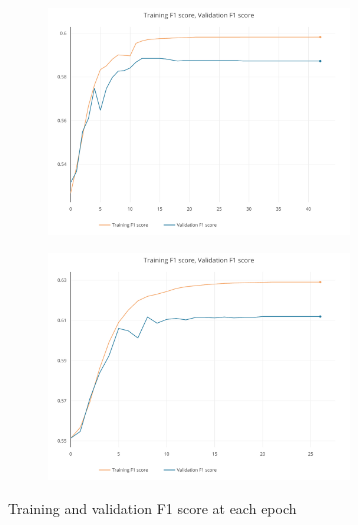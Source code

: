 \documentclass[journal]{IEEEtran}
\begin{document}
\begin{figure}[h]
	\centering

	\begin{subfigure}{0.49\textwidth}
		\centering
		\includegraphics[height = 6cm]{Images/f1score.pdf}
	\end{subfigure}
	\hspace{1mm}
	\begin{subfigure}{0.49\textwidth}
		\centering
		\includegraphics[height = 6cm]{Images/f1score1.pdf}
	\end{subfigure}
	
	\caption{Training and validation F1 score at each epoch}
\end{figure}
\end{document}
